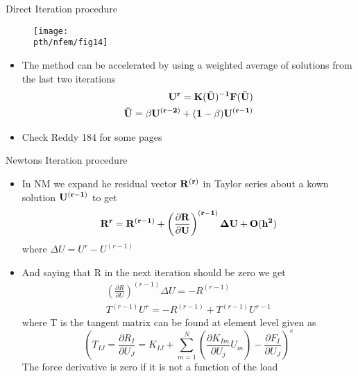 	\begin{frame}{Direct Iteration procedure}
		\begin{figure}
			\centering
			\texttt{[image: \\pth/nfem/fig14]} 
		\end{figure}
		\begin{itemize}
			\item The method can be accelerated by using a weighted average of solutions from the last two iterations
		\begin{equation}
			\begin{aligned}
				\mathbf{U^r = K(\bar{U})^{-1}F(\bar{U})} \\
				\mathbf{\bar{U} = \beta U^{(r-2)} + (1-\beta)U^{(r-1)}}
			\end{aligned}
		\end{equation}
			\item Check Reddy 184 for some pages
		\end{itemize}
	\end{frame}


	\begin{frame}{Newtons Iteration procedure}
		\begin{itemize}
			\item In NM we expand he residual vector $\mathbf{R^{(r)}}$ in Taylor series about a kown solution $\mathbf{U^{(r-1)}}$ to get
			\begin{equation}
				\mathbf{R^r = R^{(r-1)} + \left(\frac{\partial R}{\partial U} \right)^{(r-1)} {\Delta} U + O(h^2)}
			\end{equation}
			where $\Delta U =  U^r - U^{(r-1)}$
			\item And saying that R in the next iteration should be zero we get
			\begin{equation}
			\begin{aligned}
				\left(\frac{\partial R}{\partial U} \right)^{(r-1)}\Delta U = -R^{(r-1)} \\
				T^{(r-1)} U^r = -R^{(r-1)}  + T^{(r-1)} U^{r-1}
			\end{aligned}
			\end{equation} 
			where T is the tangent matrix can be found at element level given as
			\begin{equation}
			\left(T_{IJ} = \frac{\partial R_I}{\partial U_J} = K_{IJ} + \sum_{m=1}^{N} \left(
			\frac{\partial K_{Im}}{\partial U_j} U_m\right) - \frac{\partial F_I}{\partial U_J} \right)^e
			\end{equation}
			The force derivative is zero if it is not a function of the load
		\end{itemize}
	\end{frame}


